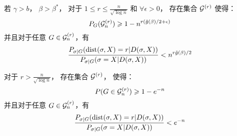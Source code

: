\begin{lemma}\label{prop:small}
  若 $\gamma>b$， $\beta>\beta^\ast$，
  对于 $1\leq r \leq \frac{n}{\sqrt{\log n}}$
  和 $\forall \epsilon > 0$，
  存在集合 $\mathcal{G}^{(r)}$ 使得：
\begin{equation}\label{eq:Gr}
  P_G(\mathcal{G}^{(r)}_n) \geqslant 1 - n^{r(\tilde{g}(\beta)/2 + \epsilon)}
  \end{equation}
  并且对于任意 $G\in\mathcal{G}^{(r)}_n$，有
\begin{equation}\label{eq:psigmaX}
  \frac{P_{\sigma|G}(\operatorname{dist}(\sigma, X)=r | D(\sigma, X))}
  {P_{\sigma|G}(\sigma=X | D(\sigma, X))} <
  n^{r \tilde{g}(\beta) /2}
  \end{equation}
  
  对于 $r> \frac{n}{\sqrt{\log n}}$， 存在集合 $\mathcal{G}^{(r)}$， 使得：
\begin{equation}\label{eq:Gr1}
  P(G\in\mathcal{G}^{(r)}_n) \geqslant 1 - e^{-n}
  \end{equation}
  并且对于任意 $G\in\mathcal{G}^{(r)}_n$，有
\begin{equation}\label{eq:psigmaX1}
  \frac{P_{\sigma|G}(\operatorname{dist}(\sigma, X)=r | D(\sigma, X))}
  {P_{\sigma|G}(\sigma=X | D(\sigma, X))} <
  e^{-n}
  \end{equation}
\end{lemma}
